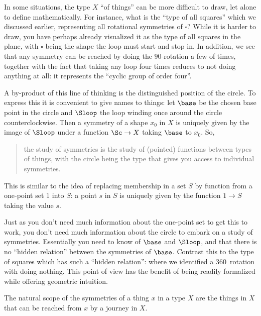 
In some situations, the type $X$ ``of things'' can be more difficult to draw,
let alone to define mathematically.  For instance, what is the ``type of all squares'' which we discussed earlier, representing all rotational symmetries of $\square$?  While it is harder to draw, you have perhaps already visualized it as the type of all squares in the plane, with $\square$ being the shape the loop must start and stop in.  In addition, we see that any symmetry can be reached by doing the $90$\textdegree-rotation a few of times, together with the fact that taking any loop four times reduces to not doing anything at all: it represents the ``cyclic group of order four''.

A by-product of this line of thinking is the distinguished position of the circle. To express this it is convenient to give names to things: let $\base$ be the chosen base point in the circle and $\Sloop$ the loop winding once around the circle counterclockwise. Then a symmetry of a shape $x_0$ in $X$ is uniquely given by the image of $\Sloop $ under a function $\Sc\to X$ taking $\base$ to $x_0$. So,
\begin{quote}
  the study of symmetries is the study of (pointed) functions between types of things, with the circle being the type that gives you access to individual symmetries.
\end{quote}

This is similar to the idea of replacing membership in a set $S$ by function from a one-point set $1$ into $S$: a point $s$ in $S$ is uniquely given by the function $1\to S$ taking the value $s$.


Just as you don't need much information about the one-point set to get this to work, you don't need much information about the circle to embark on a study of symmetries.
Essentially you need to know of $\base $ and $\Sloop $, and that there is no ``hidden relation'' between the symmetries of $\base$. Contrast this to the type of squares which has such a ``hidden relation'': where we identified a $360$\textdegree\ rotation with doing nothing.  This point of view has the benefit of being readily formalized while offering geometric intuition.


The natural scope of the symmetries of a thing $x$ in a type $X$
are the things in $X$ that can be reached from $x$ by a journey in $X$.

